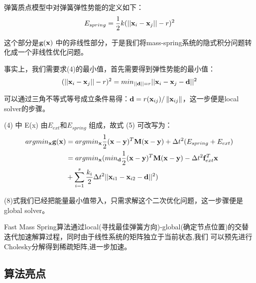 \documentclass[]{ctexart}
\begin{document}
弹簧质点模型中对弹簧弹性势能的定义如下：
\begin{equation}{E}_{spring} = \frac{1}{2}k(||\bold{x}_i-\bold{x}_j|| - r)^{2} \end{equation} 

这个部分是$ \bold{g}(\bold{x})$ 中的非线性部分，于是我们将mass-spring系统的隐式积分问题转化成一个非线性优化问题。

事实上，我们需要求(4)的最小值，首先需要得到弹性势能的最小值：
\begin{equation}(||\bold{x}_i - \bold{x}_j|| - r)^{2} = min_{||\bold{d}|| = r}||\bold{x}_i-\bold{x}_j-
	\bold{d}||^{2} \end{equation} 

	可以通过三角不等式等号成立条件易得：$\bold{d}=r(\bold{x}_{ij})/\left\lVert \bold{x}_{ij}\right\rVert $，这一步便是local
	 solver的步骤。

	  (4) 中 E(x) 由${E}_{ext} $和$ E_{spring}$ 组成，故式 (5) 可改写为：
\begin{equation} \begin{aligned} argmin_{\bold{x}}\bold{g}(\bold{x}) &= argmin_{\bold{x}}\frac{1}{2}
	(\bold{x}-\bold{y})^{T}\bold{M}(\bold{x}-\bold{y}) + \Delta t^2(E_{spring} + E_{ext}) \\ 
	&=argmin_{\bold{x}}(min_{\bold{d}}\frac{1}{2}(\bold{x}-\bold{y})^{T}\bold{M}(\bold{x}-\bold{y}) - 
	\Delta t^2 \bold{f}_{ext}^{T} \bold{x}  \\
	&+\sum_{i=1}^{s}\frac{k_i}{2}\Delta t^2||\bold{x}_{i1} - \bold{x}_{i2} - \bold{d}||^{2}) 
\end{aligned} \end{equation} 

(8)式我们已经把能量最小值带入，只需求解这个二次优化问题，这一步骤便是global solver。

Fast Mass Spring算法通过local(寻找最佳弹簧⽅向)-global(确定节点位置)的交替迭代加速解算过程，同时由于线性系统的矩阵独⽴于当前状态,我们
可以预先进行Cholesky分解得到稀疏矩阵,进一步加速。

\subsection{算法亮点}
\end{document}
